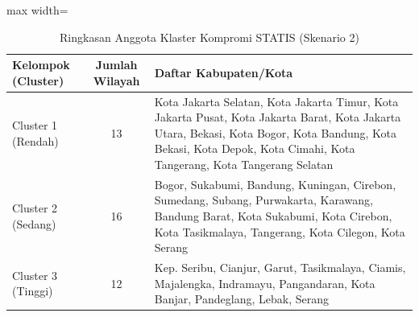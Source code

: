 \begin{table}[H]
\centering
\caption{Ringkasan Anggota Klaster Kompromi STATIS (Skenario 2)} \label{tab:app2compromclust}
\begin{adjustbox}{max width=\textwidth}
\begin{tabular}{|p{3cm}|c|p{10cm}|}
\hline
\textbf{Kelompok (Cluster)} & \textbf{Jumlah Wilayah} & \textbf{Daftar Kabupaten/Kota} \\
\hline
Cluster 1 (Rendah) & 13 & Kota Jakarta Selatan, Kota Jakarta Timur, Kota Jakarta Pusat, Kota Jakarta Barat, Kota Jakarta Utara, Bekasi, Kota Bogor, Kota Bandung, Kota Bekasi, Kota Depok, Kota Cimahi, Kota Tangerang, Kota Tangerang Selatan \\
\hline
Cluster 2 (Sedang) & 16 & Bogor, Sukabumi, Bandung, Kuningan, Cirebon, Sumedang, Subang, Purwakarta, Karawang, Bandung Barat, Kota Sukabumi, Kota Cirebon, Kota Tasikmalaya, Tangerang, Kota Cilegon, Kota Serang \\
\hline
Cluster 3 (Tinggi) & 12 & Kep. Seribu, Cianjur, Garut, Tasikmalaya, Ciamis, Majalengka, Indramayu, Pangandaran, Kota Banjar, Pandeglang, Lebak, Serang \\
\hline
\end{tabular}
\end{adjustbox}
\end{table}
